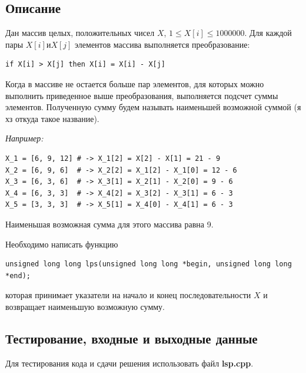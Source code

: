 \documentclass[14pt]{article}
\begin{document}
\subsection{Описание}

Дан массив целых, положительных чисел $X$, $1 \le X[i] \le 1000000$. Для каждой пары $X[i] и X[j]$ элементов массива
выполняется преобразование:
\begin{lstlisting}
if X[i] > X[j] then X[i] = X[i] - X[j]
\end{lstlisting}
Когда в массиве не остается больше пар элементов, для которых можно выполнить приведенное выше преобразования,
выполняется подсчет суммы элементов. Полученную сумму будем называть наименьшей возможной суммой (я хз откуда такое название).

\textit{Например:}
\begin{verbatim}
X_1 = [6, 9, 12] # -> X_1[2] = X[2] - X[1] = 21 - 9
X_2 = [6, 9, 6]  # -> X_2[2] = X_1[2] - X_1[0] = 12 - 6
X_3 = [6, 3, 6]  # -> X_3[1] = X_2[1] - X_2[0] = 9 - 6
X_4 = [6, 3, 3]  # -> X_4[2] = X_3[2] - X_3[1] = 6 - 3
X_5 = [3, 3, 3]  # -> X_5[1] = X_4[0] - X_4[1] = 6 - 3
\end{verbatim}
Наименьшая возможная сумма для этого массива равна 9.

Необходимо написать функцию
\begin{lstlisting}
unsigned long long lps(unsigned long long *begin, unsigned long long *end);
\end{lstlisting}
которая принимает указатели на начало и конец последовательности $X$ и возвращает наименьшую возможную сумму.

\subsection{Тестирование, входные и выходные данные}
Для тестирования кода и сдачи решения использовать файл \textbf{lsp.cpp}.
\end{document}
